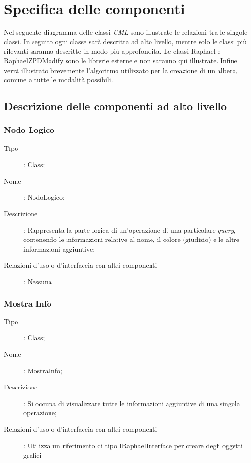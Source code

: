\section{Specifica delle componenti}
Nel seguente diagramma delle classi \textit{UML} sono illustrate le relazioni tra le singole classi. In seguito ogni classe sarà descritta ad alto livello, mentre solo le classi più rilevanti saranno descritte in modo più approfondita. Le classi Raphael e RaphaelZPDModify sono le librerie esterne e non saranno qui illustrate. Infine verrà illustrato brevemente l'algoritmo utilizzato per la creazione di un albero, comune a tutte le modalità possibili.
\subsection{Descrizione delle componenti ad alto livello}
\subsubsection{Nodo Logico}
\begin{description}
\item[Tipo]: Class;
\item[Nome]: NodoLogico;
\item[Descrizione]: Rappresenta la parte logica di un'operazione di una particolare \textit{query}, contenendo le informazioni relative al nome, il colore (giudizio) e le altre informazioni aggiuntive;
\item[Relazioni d'uso o d'interfaccia con altri componenti]: Nessuna
\end{description}
\subsubsection{Mostra Info}
\begin{description}
\item[Tipo]: Class;
\item[Nome]: MostraInfo;
\item[Descrizione]: Si occupa di visualizzare tutte le informazioni aggiuntive di una singola operazione;
\item[Relazioni d'uso o d'interfaccia con altri componenti]: Utilizza un riferimento di tipo IRaphaelInterface per creare degli oggetti grafici
\end{description}

